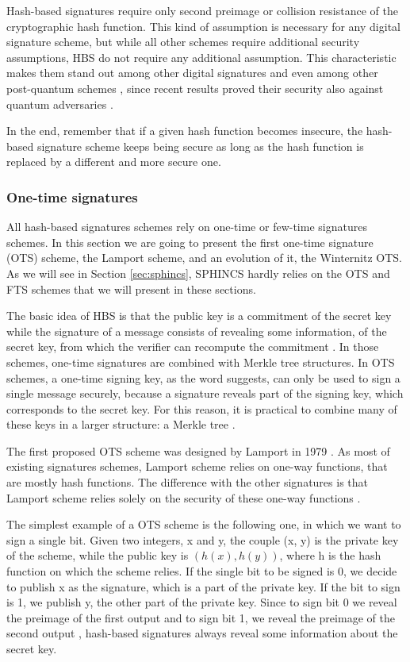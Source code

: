 \documentclass[a4paper,12pt]{article}
\begin{document}
Hash-based signatures require only second preimage or collision resistance of the cryptographic hash function. This kind of assumption is necessary for any digital signature scheme, but while all other schemes require additional security assumptions, HBS do not require any additional assumption. This characteristic makes them stand out among other digital signatures and even among other post-quantum schemes \cite{13_faultattacks}, since recent results \cite{35_Song} proved their security also against quantum adversaries \cite{1_sphincspaper}.

In the end, remember that if a given hash function becomes insecure, the hash-based signature scheme keeps being secure as long as the hash function is replaced by a different and more secure one.

\subsubsection{One-time signatures}
\label{subsub:ots}

All hash-based signatures schemes rely on one-time or few-time signatures schemes. In this section we are going to present the first one-time signature (OTS) scheme, the Lamport scheme, and an evolution of it, the Winternitz OTS. As we will see in Section \ref{sec:sphincs}, SPHINCS hardly relies on the OTS and FTS schemes that we will present in these sections.

The basic idea of HBS is that the public key is a commitment of the secret key while the signature of a message consists of revealing some information, of the secret key, from which the verifier can recompute the commitment \cite{13_faultattacks}.
In those schemes, one-time signatures are combined with Merkle tree structures.
In OTS schemes, a one-time signing key, as the word suggests, can only be used to sign a single message securely, because a signature reveals part of the signing key, which corresponds to the secret key.
For this reason, it is practical to combine many of these keys in a larger structure: a Merkle tree \cite{53_hbs}.

The first proposed OTS scheme was designed by Lamport in 1979 \cite{31_Lamport}.
As most of existing signatures schemes, Lamport scheme relies on one-way functions, that are mostly hash functions. The difference with the other signatures is that Lamport scheme relies solely on the security of these one-way functions \cite{53_hbs}.

The simplest example of a OTS scheme is the following one, in which we want to sign a single bit. Given two integers, x and y, the couple (x, y) is the private key of the scheme, while the public key is $(h(x),h(y))$, where h is the hash function on which the scheme relies.
If the single bit to be signed is 0, we decide to publish x as the signature, which is a part of the private key. If the bit to sign is 1, we publish y, the other part of the private key. Since to sign bit 0 we reveal the preimage of the first output and to sign bit 1, we reveal the preimage of the second output \cite{1_sphincspaper}, hash-based signatures always reveal some information about the secret key.
\end{document}
